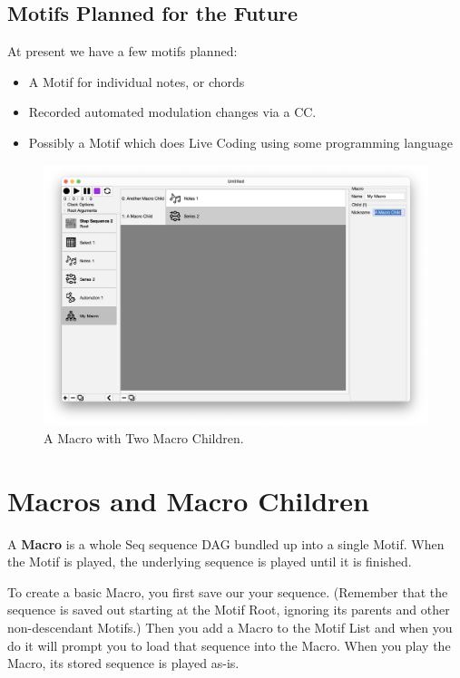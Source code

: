 \documentclass[twoside,10pt]{article}
\begin{document}
\clearpage\subsection{Motifs Planned for the Future}

At present we have a few motifs planned:

\begin{itemize}
\item A Motif for individual notes, or chords
\item Recorded automated modulation changes via a CC.
\item Possibly a Motif which does Live Coding using some programming language
\end{itemize}

\clearpage

\begin{figure}[t]
\centering
\includegraphics[width=6.5in]{Macro}
\vspace{-3em}
\caption{A Macro with Two Macro Children.}
\label{macro}
\end{figure}

\section{Macros and Macro Children}
\label{macros}

A {\bf Macro} is a whole Seq sequence DAG bundled up into a single Motif.  When the Motif is played, the underlying sequence is played until it is finished.

To create a basic Macro, you first save our your sequence.  (Remember that the sequence is saved out starting at the Motif Root, ignoring its parents and other non-descendant Motifs.)  Then you add a Macro to the Motif List and when you do it will prompt you to load that sequence into the Macro.    When you play the Macro, its stored sequence is played as-is.
\end{document}
